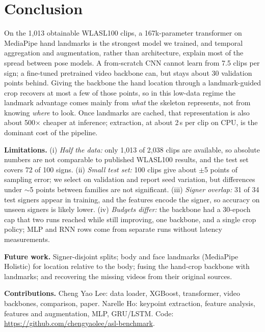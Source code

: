 \documentclass{article}
\begin{document}
\section{Conclusion}\label{sec:limits}
On the 1{,}013 obtainable WLASL100 clips, a 167k-parameter transformer on MediaPipe hand landmarks is the
strongest model we trained, and temporal aggregation and augmentation, rather than architecture, explain
most of the spread between pose models. A from-scratch CNN cannot learn from 7.5 clips per sign; a
fine-tuned pretrained video backbone can, but stays about 30 validation points behind. Giving the backbone
the hand location through a landmark-guided crop recovers at most a few of those points, so in this
low-data regime the landmark advantage comes mainly from \emph{what} the skeleton represents, not from
knowing \emph{where} to look. Once landmarks are cached, that representation is also about 500$\times$
cheaper at inference; extraction, at about 2\,s per clip on CPU, is the dominant cost of the pipeline.

\textbf{Limitations.} (i) \emph{Half the data:} only 1{,}013 of 2{,}038 clips are available, so absolute
numbers are not comparable to published WLASL100 results, and the test set covers 72 of 100 signs.
(ii) \emph{Small test set:} 100 clips give about $\pm$5 points of sampling error; we select on
validation and report seed variation, but differences under $\sim$5 points between families are not
significant. (iii) \emph{Signer overlap:} 31 of 34 test signers appear in training, and the features
encode the signer, so accuracy on unseen signers is likely lower. (iv) \emph{Budgets differ:} the backbone
had a 30-epoch cap that two runs reached while still improving, one backbone, and a single crop policy;
MLP and RNN rows come from separate runs without latency measurements.

\textbf{Future work.} Signer-disjoint splits; body and face landmarks (MediaPipe Holistic) for location
relative to the body; fusing the hand-crop backbone with landmarks; and recovering the missing videos
from their original sources.

\textbf{Contributions.} Cheng Yao Lee: data loader, XGBoost, transformer, video backbones, comparison, paper.
Narelle Ho: keypoint extraction, feature analysis, features and augmentation, MLP, GRU/LSTM.
Code: \url{https://github.com/chengyaolee/asl-benchmark}.



\end{document}
